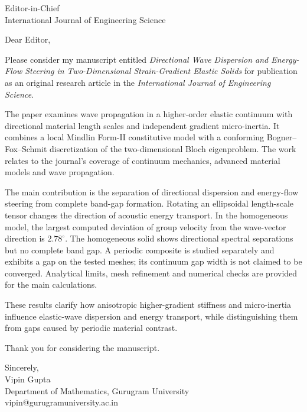 \documentclass[11pt,a4paper]{letter}
\begin{document}
\begin{letter}{Editor-in-Chief\\International Journal of Engineering Science}
\opening{Dear Editor,}

Please consider my manuscript entitled \emph{Directional Wave Dispersion and Energy-Flow Steering in Two-Dimensional Strain-Gradient Elastic Solids} for publication as an original research article in the \emph{International Journal of Engineering Science}.

The paper examines wave propagation in a higher-order elastic continuum with directional material length scales and independent gradient micro-inertia. It combines a local Mindlin Form-II constitutive model with a conforming Bogner--Fox--Schmit discretization of the two-dimensional Bloch eigenproblem. The work relates to the journal's coverage of continuum mechanics, advanced material models and wave propagation.

The main contribution is the separation of directional dispersion and energy-flow steering from complete band-gap formation. Rotating an ellipsoidal length-scale tensor changes the direction of acoustic energy transport. In the homogeneous model, the largest computed deviation of group velocity from the wave-vector direction is $2.78^\circ$. The homogeneous solid shows directional spectral separations but no complete band gap. A periodic composite is studied separately and exhibits a gap on the tested meshes; its continuum gap width is not claimed to be converged. Analytical limits, mesh refinement and numerical checks are provided for the main calculations.

These results clarify how anisotropic higher-gradient stiffness and micro-inertia influence elastic-wave dispersion and energy transport, while distinguishing them from gaps caused by periodic material contrast.

Thank you for considering the manuscript.

\closing{Sincerely,\\Vipin Gupta\\Department of Mathematics, Gurugram University\\vipin@gurugramuniversity.ac.in}
\end{letter}
\end{document}
